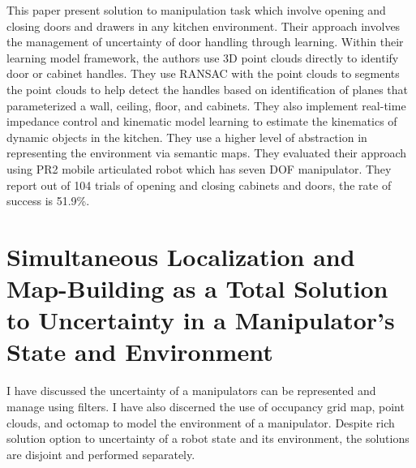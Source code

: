 \textcite{Ruhr2012} This paper present solution to manipulation task which involve
opening and closing doors and drawers in any kitchen environment. Their approach involves the
management of uncertainty of door handling through learning. Within their learning model
framework, the authors use 3D point clouds directly to identify door or cabinet handles. They use \acrfull{RANSAC} with the point clouds to segments the point clouds to help detect the handles
based on identification of planes that parameterized a wall, ceiling, floor, and cabinets. They
also implement real-time impedance control and kinematic model learning to estimate the
kinematics of dynamic objects in the kitchen. They use a higher level of abstraction in
representing the environment via semantic maps.
They evaluated their approach using PR2 mobile articulated robot which has seven DOF manipulator.
They report out of 104 trials of opening and closing cabinets and doors, the rate of success is
51.9\%.

\section{Simultaneous Localization and Map-Building as a Total Solution to Uncertainty in a Manipulator's State and Environment}\label{sec:slam_solution}

I have discussed the uncertainty of a manipulators can be represented and manage using
filters. I have also discerned the use of occupancy grid map, point clouds, and octomap to
model the environment of a manipulator. Despite rich solution option to uncertainty of a robot
state and its environment, the solutions are disjoint and performed separately.

 

